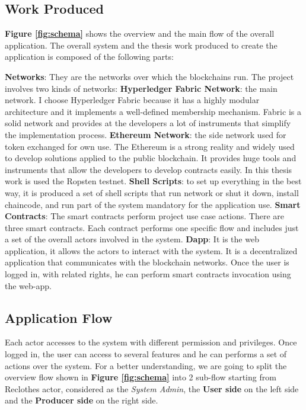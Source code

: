 \subsection{Work Produced}

\textbf{Figure \ref{fig:schema}} shows the overview and the main flow of the overall application.
The overall system and the thesis work produced to create the application is composed of the following parts:
\begin{outline}
    \1 \textbf{Networks}: They are the networks over which the blockchains run. The project involves two kinds of networks:
    \2 \textbf{Hyperledger Fabric Network}: the main network. I choose Hyperledger Fabric because it has a highly modular 
    architecture and it implements a well-defined membership mechanism. Fabric is a solid network and provides at the 
    developers a lot of instruments that simplify the implementation process.  
    \2 \textbf{Ethereum Network}: the side network used for token exchanged for own use. The Ethereum is a strong 
    reality and widely used to develop solutions applied to the public blockchain. It provides huge tools and instruments 
    that allow the developers to develop contracts easily. In this thesis work is used the Ropsten testnet.    
    \1 \textbf{Shell Scripts}: to set up everything in the best way, it is produced a set of 
    shell scripts that run network or shut it down, install chaincode, and run part of the system mandatory 
    for the application use. 
    \1 \textbf{Smart Contracts}: The smart contracts perform project use case actions. 
    There are three smart contracts. Each contract performs one specific flow and includes just
    a set of the overall actors involved in the system.  
    \1 \textbf{Dapp}: It is the web application, it allows the actors to interact with the system. It is a 
    decentralized application that communicates with the blockchain networks. Once the user is logged in, 
    with related rights, he can perform smart contracts invocation using the web-app.
\end{outline}

\subsection{Application Flow}

Each actor accesses to the system with different permission and privileges. Once logged in, 
the user can access to several features and he can performs a set of actions over the system. 
For a better understanding, we are going to split the overview flow shown in \textbf{Figure \ref{fig:schema}} 
into 2 sub-flow starting from Reclothes actor, considered as the \textit{System Admin}, 
the \textbf{User side} on the left side and the \textbf{Producer side} on the right side. 

